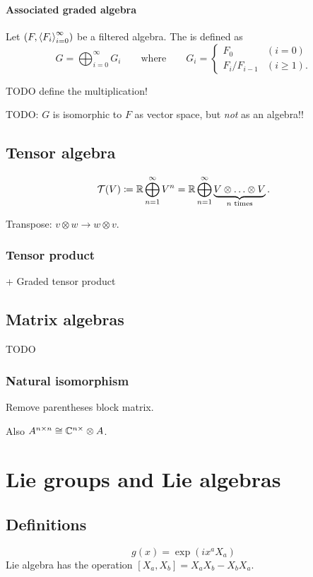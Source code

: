 \subsubsection{Associated graded algebra}
\begin{definition}
Let $\left( F,\left\langle F_i \right\rangle_{i=0}^\infty \right)$ be a filtered algebra. The  is defined as
\[ G = \bigoplus_{i=0}^\infty G_i \qquad\text{where}\qquad G_i = \begin{cases}
F_0 & (i=0) \\
F_{i}/F_{i-1} & (i \geq 1).
\end{cases} \]
\end{definition}
TODO define the multiplication!

TODO: $G$ is isomorphic to $F$ as vector space, but \emph{not} as an algebra!!


\section{Tensor algebra}
\[ \mathcal{T}(V) \coloneqq \mathbb{R} \bigoplus_{n=1}^\infty V^n = \mathbb{R} \bigoplus_{n=1}^\infty \underbrace{V\otimes \ldots \otimes V}_{\text{$n$ times}}. \]

Transpose: $v\otimes w \to w\otimes v$.

\subsection{Tensor product}
+ Graded tensor product

\section{Matrix algebras}
\begin{definition}
TODO
\end{definition}

\subsection{Natural isomorphism}
Remove parentheses block matrix.

Also $A^{n\times n} \cong \mathbb{C}^{n\times }\otimes A$.

\chapter{Lie groups and Lie algebras}
\section{Definitions}
\[ g(x) = \exp(ix^aX_a) \]
Lie algebra has the operation $[X_a,X_b]= X_aX_b - X_bX_a$. 
